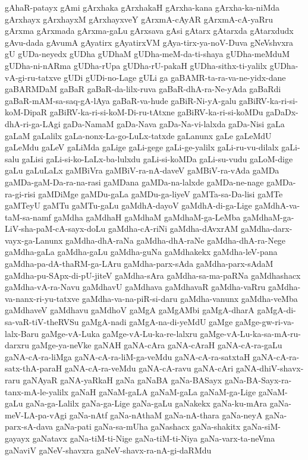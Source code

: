 {gAhaR-patayx
gAmi
gArxhaka
gArxhakaH
gArxha-kana
gArxha-ka-niMda
gArxhayx
gArxhayxM
gArxhayxveY
gArxmA-cAyAR
gArxmA-cA-yaRru
gArxma
gArxmada
gArxma-gaLu
gArxsava
gAsi
gAtarx
gAtarxda
gAtarxdudx
gAvu-dada
gAvumA
gAyatirx
gAyatirxVM
gAya-tirx-ya-noV-Duva
gNeVshvxra
gU
gUDa-neyedx
gUDha
gUDhaM
gUDha-meM-da-ti-shaya
gUDha-meMduM
gUDha-ni-nARma
gUDha-rUpa
gUDha-rU-pakaH
gUDha-sithx-ti-yalilx
gUDha-vA-gi-ru-tatxve
gUDi
gUDi-no-Lage
gULi
ga
gaBAMR-ta-ra-va-ne-yidx-dane
gaBARMDaM
gaBaR
gaBaR-da-lilx-ruva
gaBaR-dhA-ra-Ne-yAda
gaBaRdi
gaBaR-mAM-sa-saq-gA-lAya
gaBaR-va-hude
gaBiR-Ni-yA-galu
gaBiRV-ka-ri-si-koM-DipaR
gaBiRV-ka-ri-si-koM-Di-ru-tAtxne
gaBiRV-ka-ri-si-koMDu
gaDaDx-dhA-ri-ga-LAgi
gaDa-NamaM
gaDa-Nava
gaDa-Na-vi-lalxda
gaDa-Nisi
gaLa
gaLaM
gaLalilx
gaLa-nonx-La-go-LuLx-tatxde
gaLanunx
gaLe
gaLeMdU
gaLeMdu
gaLeV
gaLiMda
gaLige
gaLi-gege
gaLi-ge-yalilx
gaLi-ru-vu-dilalx
gaLi-salu
gaLisi
gaLi-si-ko-LaLx-ba-lulxdu
gaLi-si-koMDa
gaLi-su-vudu
gaLoM-dige
gaLu
gaLuLaLx
gaMBiVra
gaMBiV-ra-nA-daveV
gaMBiV-ra-vAda
gaMDa
gaMDa-gaM-Da-ra-na-rasi
gaMDana
gaMDa-na-lalxde
gaMDa-ne-nage
gaMDa-ra-gi-risi
gaMDiMge
gaMDu-gaLa
gaMDu-ga-liyeV
gaMTa-sa-Da-lisi
gaMTe
gaMTeyU
gaMTu
gaMTu-gaLu
gaMdhA-dayoV
gaMdhA-di-ga-Lige
gaMdhA-va-taM-sa-namf
gaMdha
gaMdhaH
gaMdhaM
gaMdhaM-ga-LeMba
gaMdhaM-ga-LiV-sha-paM-cA-sayx-doLu
gaMdha-cA-riNi
gaMdha-dAvxrAM
gaMdha-darx-vayx-ga-Lanunx
gaMdha-dhA-raNa
gaMdha-dhA-raNe
gaMdha-dhA-ra-Nege
gaMdha-gaLa
gaMdha-gaLu
gaMdha-guNa
gaMdhakekx
gaMdha-leV-pana
gaMdha-pa-dA-thaRM-ga-LAru
gaMdha-parx-sAda
gaMdha-parx-sAdaM
gaMdha-pu-SApx-di-pU-jiteV
gaMdha-sAra
gaMdha-sa-ma-paRNa
gaMdhashacx
gaMdha-vA-ra-Navu
gaMdhavU
gaMdhava
gaMdhavaR
gaMdha-vaRru
gaMdha-va-nanx-ri-yu-tatxve
gaMdha-va-na-piR-si-daru
gaMdha-vanunx
gaMdha-veMba
gaMdhaveV
gaMdhavu
gaMdhoV
gaMgA
gaMgAMbi
gaMgA-dharA
gaMgA-di-sa-vaR-tiV-theRVSu
gaMgA-nadi
gaMgA-na-di-yeMdU
gaMge
gaMge-gw-ri-va-lalx-Baru
gaMge-vA-Luka
gaMge-vA-Lu-ka-re-lalxru
gaMge-vA-Lu-ka-sa-mA-ru-darxru
gaMge-ya-neVke
gaNAH
gaNA-cAra
gaNA-cAraH
gaNA-cA-ra-gaLu
gaNA-cA-ra-liMga
gaNA-cA-ra-liM-ga-veMdu
gaNA-cA-ra-satxtaH
gaNA-cA-ra-satx-thA-paraH
gaNA-cA-ra-veMdu
gaNA-cA-ravu
gaNA-cAri
gaNA-dhiV-shavx-raru
gaNAyaR
gaNA-yaRkaH
gaNa
gaNaBA
gaNa-BASayx
gaNa-BA-Sayx-ra-tanx-mA-le-yalilx
gaNaH
gaNaM-gaLA
gaNaM-gaLa
gaNaM-ga-Lige
gaNaM-gaLu
gaNa-ga-Lalilx
gaNa-ga-Lige
gaNa-gaLu
gaNakekx
gaNa-ku-mAra
gaNa-meV-LA-pa-vAgi
gaNa-nAtf
gaNa-nAthaM
gaNa-nA-thara
gaNa-neyA
gaNa-parx-sA-dava
gaNa-pati
gaNa-sa-mUha
gaNashacx
gaNa-shakitx
gaNa-siM-gayayx
gaNatavx
gaNa-tiM-ti-Nige
gaNa-tiM-ti-Niya
gaNa-varx-ta-neVma
gaNaviV
gaNeV-shavxra
gaNeV-shavx-ra-nA-gi-daRMdu
}
